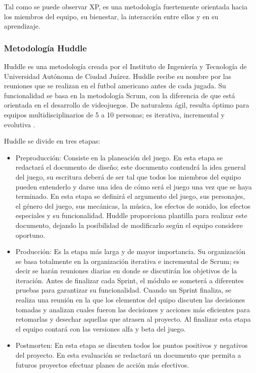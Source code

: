 Tal como se puede observar XP, es una metodología fuertemente orientada hacia los miembros del equipo, su bienestar, la interacción entre ellos y en su aprendizaje.

\subsubsection{Metodología Huddle}
Huddle es una metodología creada por el Instituto de Ingeniería y Tecnología de Universidad Autónoma de Ciudad Juárez. Huddle recibe su nombre por las reuniones que se realizan en el futbol americano antes de cada jugada. Su funcionalidad se basa en la metodología Scrum, con la diferencia de que está orientada en el desarrollo de videojuegos.  De naturaleza ágil, resulta óptimo para equipos multidisciplinarios de 5 a 10 personas; es iterativa, incremental y evolutiva \cite{Ref_Huddle}.
\\
\par
Huddle se divide en tres etapas: 
	\begin{itemize}
		\item Preproducción: Consiste en la planeación del juego. En esta etapa se redactará el documento de diseño; este documento contendrá la idea general del juego, su escritura deberá de ser tal que todos los miembros del equipo pueden entenderlo y darse una idea de cómo será el juego una vez que se haya terminado. En esta etapa se definirá el argumento del juego, sus personajes, el género del juego, sus mecánicas, la música, los efectos de sonido, los efectos especiales y su funcionalidad. Huddle proporciona plantilla para realizar este documento, dejando la posibilidad de modificarlo según el equipo considere oportuno.
		\item Producción: Es la etapa más larga y de mayor importancia. Su organización se basa totalmente en la organización iterativa e incremental de Scrum; es decir se harán reuniones diarias en donde se discutirán los objetivos de la iteración. Antes de finalizar cada Sprint, el módulo se someterá a diferentes pruebas para garantizar su funcionalidad. Cuando un Sprint finaliza, se realiza una reunión en la que los elementos del quipo discuten las decisiones tomadas y analizan cuales fueron las decisiones y acciones más eficientes para retomarlas y desechar aquellas que atrasen al proyecto. Al finalizar esta etapa el equipo contará con las versiones alfa y beta del juego. 
		\item Postmorten: En esta etapa se discuten todos los puntos positivos y negativos del proyecto. En esta evaluación se redactará un documento que permita a futuros proyectos efectuar planes de acción más efectivos\cite{Ref_Huddle}.
	\end{itemize}